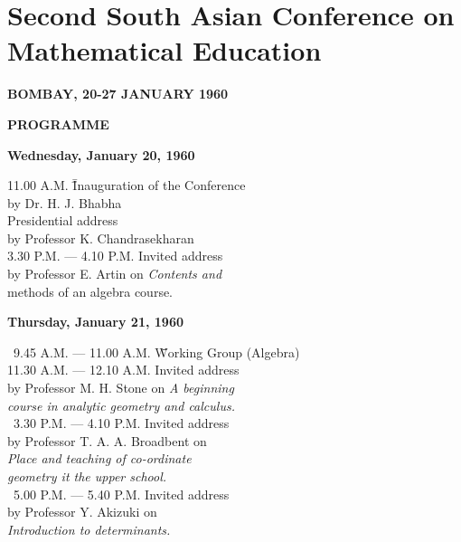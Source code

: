 
\chapter{Second South Asian Conference on Mathematical Education}

\begin{center}
\textbf{BOMBAY, 20-27 JANUARY 1960}

\bigskip

\textbf{\Large{PROGRAMME}}

\medskip

\textbf{Wednesday, January 20, 1960}
\end{center}


\begin{tabbing}
11.00 A.M. \hspace{2.5cm}\= \= Inauguration of the Conference\\
\> \> by Dr. H. J. Bhabha\\[0.2cm]
\> \> Presidential address\\
\> \> by Professor K. Chandrasekharan\\[0.2cm]
3.30 P.M. --- 4.10 P.M. \qquad \> \> Invited address\\
\> \> by Professor E. Artin on \textit{Contents and}\\
\> \> methods of an algebra course.
\end{tabbing}

\begin{center}
\textbf{Thursday, January 21, 1960}
\end{center}

\begin{tabbing}
~9.45 A.M. --- 11.00 A.M. \quad \= \= Working Group (Algebra)\\[0.2cm]
11.30 A.M. --- 12.10 A.M. \> \> Invited address\\
\> \> by Professor M. H. Stone on \textit{A beginning}\\
\>\>\textit{course in analytic geometry and calculus.}\\[0.2cm]
~3.30 P.M. --- 4.10 P.M. \> \> Invited address\\
\> \> by Professor T. A. A. Broadbent on\\
\> \> \textit{Place and teaching of co-ordinate}\\
\> \> \textit{geometry it the upper school.}\\[0.2cm]
~5.00 P.M. --- 5.40 P.M. \> \> Invited address\\
\> \> by Professor Y. Akizuki on \\
\> \> \textit{Introduction to determinants.}
\end{tabbing}

